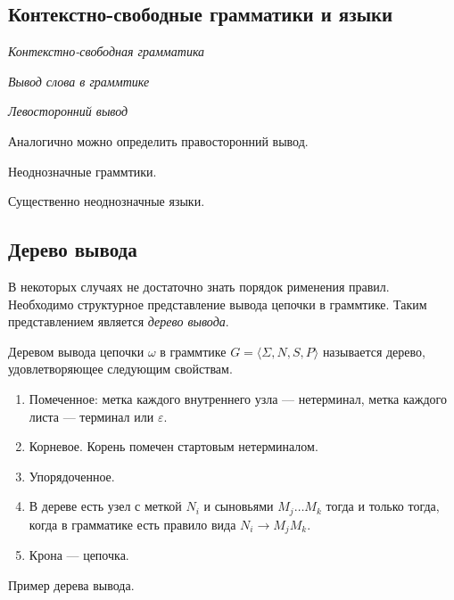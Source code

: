 \subsection{Контекстно-свободные грамматики и языки}



\begin{definition}
\textit{Контекстно-свободная грамматика}
\end{definition}

\begin{definition}
\textit{Вывод слова в граммтике}
\end{definition}

\begin{definition}
\textit{Левосторонний вывод}
\end{definition}

Аналогично можно определить правосторонний вывод.

Неоднозначные граммтики.

Существенно неоднозначные языки.


\subsection{Дерево вывода}
В некоторых случаях не достаточно знать порядок рименения правил.
Необходимо структурное представление вывода цепочки в граммтике.
Таким представлением является \textit{дерево вывода}.
\begin{definition}
Деревом вывода цепочки $\omega$ в граммтике $G=\langle \Sigma, N, S, P \rangle$ называется дерево, удовлетворяющее следующим свойствам.

\begin{enumerate}
  \item Помеченное: метка каждого внутреннего узла --- нетерминал, метка каждого листа --- терминал или $\varepsilon$.
  \item Корневое. Корень помечен стартовым нетерминалом.
  \item Упорядоченное.
  \item В дереве есть узел с меткой $N_i$ и сыновьями $M_j \dots M_k$ тогда и только тогда, когда в грамматике есть правило вида $N_i \to M_j M_k$.
  \item Крона --- цепочка.
\end{enumerate}
\end{definition}

\begin{example}
  Пример дерева вывода.

\end{example}


